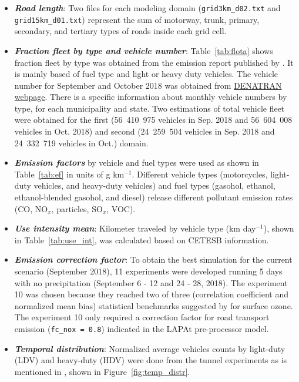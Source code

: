 		\begin{itemize}
			\item \textbf{\textit{Road length}}: Two files for each modeling domain (\verb|grid3km_d02.txt| and \verb|grid15km_d01.txt|) represent the sum of motorway, trunk, primary, secondary, and tertiary types of roads inside each grid cell.
			\item \textbf{\textit{Fraction fleet by type and vehicle number}}: Table~\ref{tab:flota} shows fraction fleet by type was obtained from the emission report published by \citet{CETESB2019a}. It is mainly based of fuel type and light or heavy duty vehicles. The vehicle number for September and October 2018 was obtained from  \href{https://www.gov.br/infraestrutura/pt-br/assuntos/transito/conteudo-denatran/frota-de-veiculos-2018}{DENATRAN webpage}. There is a specific information about monthly vehicle numbers by type, for each municipality and state. Two estimations of total vehicle fleet were obtained for the first (56~410~975 vehicles in Sep. 2018 and 56~604~008 vehicles in Oct. 2018) and second (24~259~504 vehicles in Sep. 2018 and 24~332~719 vehicles in Oct.) domain. 
			\item \textbf{\textit{Emission factors}} by vehicle and fuel types were used as shown in Table~\ref{tab:ef} in units of g km$^{-1}$. Different vehicle types (motorcycles, light-duty vehicles, and heavy-duty vehicles) and fuel types (gasohol, ethanol, ethanol-blended gasohol, and diesel) release different pollutant emission rates (CO, NO$_x$, particles, SO$_x$, VOC). 
			\item \textbf{\textit{Use intensity mean}}: Kilometer traveled by vehicle type (km day$^{-1}$), shown in Table~\ref{tab:use_int}, was calculated based on CETESB information. 
			\item \textbf{\textit{Emission correction factor}}: To obtain the best simulation for the current scenario (September 2018), 11 experiments were developed running 5 days with no precipitation (September 6 - 12 and 24 - 28, 2018). The experiment 10 was chosen because they reached two of three (correlation coefficient and normalized mean bias) statistical benchmarks suggested by \citet{Emery2017} for surface ozone. The experiment 10 only required a correction factor for road transport emission (\verb|fc_nox = 0.8|) indicated in the LAPAt pre-processor model.
			\item \textbf{\textit{Temporal distribution}}: Normalized average vehicles counts by light-duty (LDV) and heavy-duty (HDV) were done from the tunnel experiments as is mentioned in \citet{Andrade2015}, shown in Figure~\ref{fig:temp_distr}. 	

\end{itemize}
